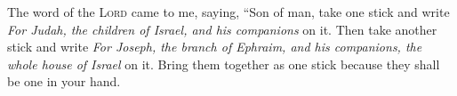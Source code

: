 
\begin{inparaenum}
     The word of the \textsc{Lord} came to me, saying,%
     ``Son of man, take one stick and write \textit{For Judah, the children of Israel, and his companions} on it. Then take another stick and write \textit{For Joseph, the branch of Ephraim, and his companions, the whole house of Israel} on it.%
     Bring them together as one stick because they shall be one in your hand.%
\end{inparaenum}
